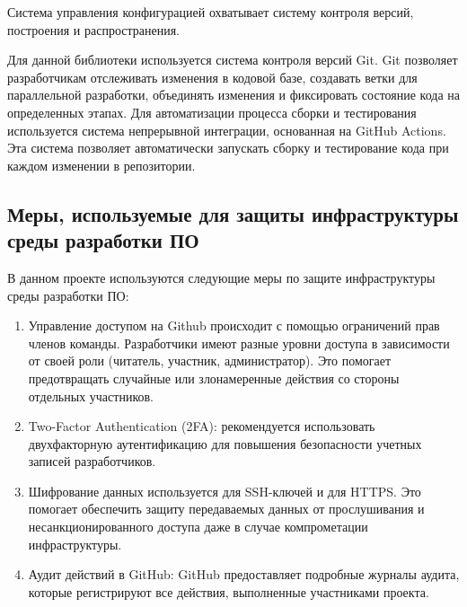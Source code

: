 Система управления конфигурацией охватывает систему контроля версий, построения и распространения.

Для данной библиотеки используется система контроля версий Git. Git позволяет разработчикам отслеживать изменения в кодовой базе, создавать ветки для параллельной разработки, объединять изменения и фиксировать состояние кода на определенных этапах.
Для автоматизации процесса сборки и тестирования используется система непрерывной интеграции, основанная на GitHub Actions. Эта система позволяет автоматически запускать сборку и тестирование кода при каждом изменении в репозитории.

\subsection{Меры, используемые для защиты инфраструктуры среды разработки ПО}

В данном проекте используются следующие меры по защите инфраструктуры среды разработки ПО:

\begin{enumerate}
    \item Управление доступом на Github происходит с помощью ограничений прав членов команды. Разработчики имеют разные уровни доступа в зависимости от своей роли (читатель, участник, администратор). Это помогает предотвращать случайные или злонамеренные действия со стороны отдельных участников.
    \item Two-Factor Authentication (2FA): рекомендуется использовать двухфакторную аутентификацию для повышения безопасности учетных записей разработчиков.
    \item Шифрование данных используется для SSH-ключей и для HTTPS. Это помогает обеспечить защиту передаваемых данных от прослушивания и несанкционированного доступа даже в случае компрометации инфраструктуры.
    \item Аудит действий в GitHub: GitHub предоставляет подробные журналы аудита, которые регистрируют все действия, выполненные участниками проекта.
\end{enumerate}


